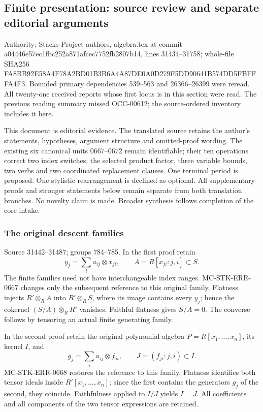 \subsection{Finite presentation: source review and separate editorial arguments}\label{finite-presentation-source-review-and-separate-editorial-arguments}

Authority: Stacks Project authors, algebra.tex at commit a04446e57ec1fbc252a871afcec7752fb2807b14, lines 31434--31758; whole-file SHA256 FA8BB92E58A4F78A2BD01B3B6A4A87DE0A0D279F5DD90641B574DD5FBFFFA4F3. Bounded primary dependencies 539--563 and 26366--26399 were reread. All twenty-one received reports whose first locus is in this section were read. The previous reading summary missed OCC-00612; the source-ordered inventory includes it here.

This document is editorial evidence. The translated source retains the author's statements, hypotheses, argument structure and omitted-proof wording. The existing six canonical units 0667--0672 remain identifiable; their ten operations correct two index switches, the selected product factor, three variable bounds, two verbs and two coordinated replacement clauses. One terminal period is proposed. One stylistic rearrangement is declined as optional. All supplementary proofs and stronger statements below remain separate from both translation branches. No novelty claim is made. Broader synthesis follows completion of the core intake.

\subsubsection{The original descent families}\label{the-original-descent-families}

Source 31442--31487; groups 784--785. In the first proof retain \[
y_j=\sum_i a_{ij}\otimes x_{ji},\qquad
A=R[x_{ji}:j,i]\subset S.
\] The finite families need not have interchangeable index ranges. MC-STK-ERR-0667 changes only the subsequent reference to this original family. Flatness injects \(R'\otimes_R A\) into \(R'\otimes_R S\), where its image contains every \(y_j\); hence the cokernel \((S/A)\otimes_R R'\) vanishes. Faithful flatness gives \(S/A=0\). The converse follows by tensoring an actual finite generating family.

In the second proof retain the original polynomial algebra \(P=R[x_1,\ldots,x_n]\), its kernel \(I\), and \[
g_j=\sum_i a_{ij}\otimes f_{ji},\qquad
J=(f_{ji}:j,i)\subset I.
\] MC-STK-ERR-0668 restores the reference to this family. Flatness identifies both tensor ideals inside \(R'[x_1,\ldots,x_n]\); since the first contains the generators \(g_j\) of the second, they coincide. Faithfulness applied to \(I/J\) yields \(I=J\). All coefficients and all components of the two tensor expressions are retained.

